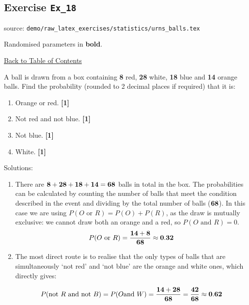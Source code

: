 \documentclass[a4paper, leqno, 12pt]{report}
\newenvironment{top_enumerate}{
\begin{enumerate}
  \setlength{\itemsep}{2em}
  \setlength{\topsep}{-0pt}
  \setlength{\partopsep}{-0pt}
}{\end{enumerate}}
\begin{document}
\subsection{Exercise \texttt{Ex\_18}}
source: \texttt{demo/raw\_latex\_exercises/statistics/urns\_balls.tex}

Randomised parameters in \textbf{bold}. 

\hyperlink{contents}{Back to Table of Contents}
\begin{top_enumerate}
\item A ball is drawn from a box containing {\bf 8} red, {\bf 28} white, {\bf 18} blue and {\bf 14} orange balls. Find the probability (rounded to 2 decimal places if required) that it is:
 
\setcounter{equation}{0}  %
\begin{enumerate}
	\setlength{\topsep}{-0pt}
	\setlength{\partopsep}{-0pt}
	\setlength{\itemsep}{10pt}
			\item Orange or red.
	 \quad \textbf{[1]}
		\item Not red and not blue.
	 \quad \textbf{[1]}
		\item Not blue.
	 \quad \textbf{[1]}
		\item White.
	 \quad \textbf{[1]}
\end{enumerate}\addtocounter{enumi}{-1}
\item Solutions:
 
\setcounter{equation}{0}  %
\begin{enumerate}
	\setlength{\topsep}{-0pt}
	\setlength{\partopsep}{-0pt}
	\setlength{\itemsep}{10pt}
			\item There are ${\bf 8} + {\bf 28} + {\bf 18} + {\bf 14} = {\bf 68}$ balls in total in the box. The probabilities can be calculated by counting the number of balls that meet the condition described in the event and dividing by the total number of balls (${\bf 68}$). In this case we are using $P(O \textrm{ or } R) = P(O) + P(R)$, as the draw is mutually exclusive: we cannot draw both an orange and a red, so $P(O \textrm{ and } R) = 0$.
	\[
	P(O \textrm{ or } R) = \frac{{\bf 14} + {\bf 8}}{\bf 68} \approx {\bf 0.32}
	\]
	 \quad \textbf{}
		\item The most direct route is to realise that the only types of balls that are simultaneously `not red' and `not blue' are the orange and white ones, which directly gives:
	
	\[
	P(\textrm{not } R \textrm{ and not } B) =  P( O \textrm{and } W) = \frac{{\bf 14}+{\bf 28}}{{\bf 68}} = \frac{{\bf 42}}{{\bf 68}} \approx {\bf 0.62}
	\]
	

\end{enumerate}
\end{top_enumerate}
\end{document}
